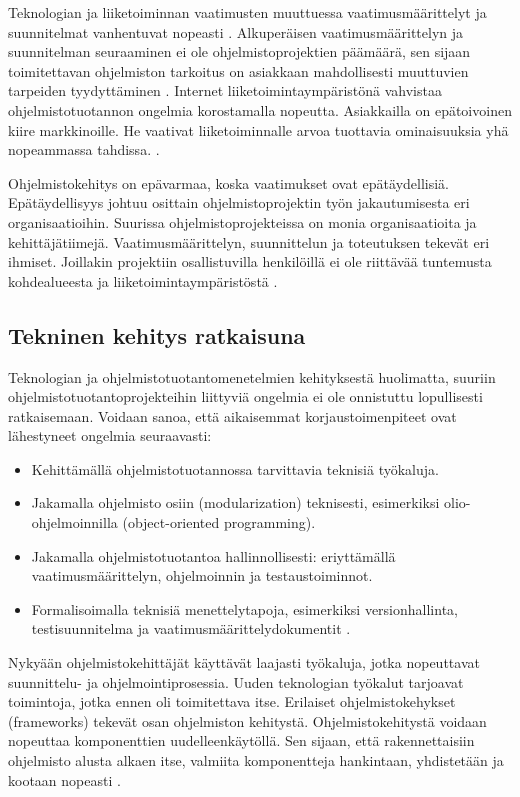 \documentclass[finnish]{tktltiki2}
\theoremstyle{definition}
\theoremstyle{remark}
\begin{document}
Teknologian ja liiketoiminnan vaatimusten muuttuessa vaatimusmäärittelyt ja suunnitelmat vanhentuvat nopeasti \cite{WIC03}. Alkuperäisen vaatimusmäärittelyn ja suunnitelman seuraaminen ei ole ohjelmistoprojektien päämäärä, sen sijaan toimitettavan ohjelmiston tarkoitus on asiakkaan mahdollisesti muuttuvien tarpeiden tyydyttäminen \cite{HIC01}. Internet liiketoimintaympäristönä vahvistaa ohjelmistotuotannon ongelmia korostamalla nopeutta. Asiakkailla on epätoivoinen kiire markkinoille. He vaativat liiketoiminnalle arvoa tuottavia ominaisuuksia yhä nopeammassa tahdissa. \cite{BRL03}.

Ohjelmistokehitys on epävarmaa, koska vaatimukset ovat epätäydellisiä. Epätäydellisyys johtuu osittain ohjelmistoprojektin työn jakautumisesta eri organisaatioihin.
Suurissa ohjelmistoprojekteissa on monia organisaatioita ja kehittäjätiimejä. Vaatimusmäärittelyn, suunnittelun ja toteutuksen tekevät eri ihmiset. Joillakin projektiin osallistuvilla henkilöillä ei ole riittävää tuntemusta kohdealueesta ja liiketoimintaympäristöstä \cite{KES95}.

\subsection{Tekninen kehitys ratkaisuna}

Teknologian ja ohjelmistotuotantomenetelmien kehityksestä huolimatta, suuriin ohjelmistotuotantoprojekteihin liittyviä ongelmia ei ole onnistuttu lopullisesti ratkaisemaan.
Voidaan sanoa, että aikaisemmat korjaustoimenpiteet ovat lähestyneet ongelmia seuraavasti:
\begin{itemize}
\item Kehittämällä ohjelmistotuotannossa tarvittavia teknisiä työkaluja.
\item Jakamalla ohjelmisto osiin (modularization) teknisesti, esimerkiksi olio-ohjelmoinnilla (object-oriented programming).
\item Jakamalla ohjelmistotuotantoa hallinnollisesti: eriyttämällä vaatimusmäärittelyn, ohjelmoinnin ja testaustoiminnot.
\item Formalisoimalla teknisiä menettelytapoja, esimerkiksi versionhallinta, testisuunnitelma ja vaatimusmäärittelydokumentit \cite{KES95}.
\end{itemize}

Nykyään ohjelmistokehittäjät käyttävät laajasti työkaluja, jotka nopeuttavat suunnittelu- ja ohjelmointiprosessia. Uuden teknologian työkalut tarjoavat toimintoja, jotka ennen oli toimitettava itse. Erilaiset ohjelmistokehykset (frameworks) tekevät osan ohjelmiston kehitystä. Ohjelmistokehitystä voidaan nopeuttaa komponenttien uudelleenkäytöllä. Sen sijaan, että rakennettaisiin ohjelmisto alusta alkaen itse, valmiita komponentteja hankintaan, yhdistetään ja kootaan nopeasti \cite{BRL03}.
\end{document}

